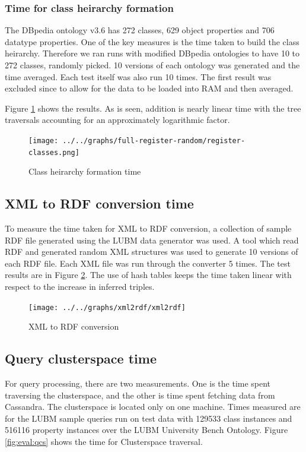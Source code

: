 \documentclass[conference]{IEEEtran}
\begin{document}
\subsubsection{Time for class heirarchy formation}

The DBpedia ontology v3.6 has 272 classes, 629 object properties and 706
datatype properties. One of the key measures is the time taken to build the
class heirarchy. Therefore we ran runs with modified DBpedia ontologies to have
10 to 272 classes, randomly picked. 10 versions of each ontology was generated
and the time averaged. Each test itself was also run 10 times. The first
result was excluded since to allow for the data to be loaded into RAM and
then averaged.

Figure \ref{fig:eval:cs-ch-form} shows the results. As is seen, addition is
nearly linear time with the tree traversals
accounting for an approximately logarithmic factor.

\begin{figure}[h]
    \centering
    \texttt{[image: ../../graphs/full-register-random/register-classes.png]}
    \caption{Class heirarchy formation time}
    \label{fig:eval:cs-ch-form}
\end{figure}

\subsection{XML to RDF conversion time}

To measure the time taken for XML to RDF conversion, a collection of sample RDF file
generated using the LUBM data generator was used. A tool which read RDF and generated random XML structures
was used to generate 10 versions of each RDF file. Each XML file was run through the converter 5 times. The test results are in Figure \ref{fig:eval:xml2rdf}. The use of hash tables keeps the time taken linear with respect to the increase in inferred triples.

\begin{figure}[h]
    \centering
    \texttt{[image: ../../graphs/xml2rdf/xml2rdf]}
    \caption{XML to RDF conversion}
    \label{fig:eval:xml2rdf}
\end{figure}

\subsection{Query clusterspace time}

For query processing, there are two measurements. One is the time spent traversing the clusterspace, and the other is time spent fetching data from Cassandra. The clusterspace is located only on one machine. Times measured are for the LUBM sample queries run on test data with 129533 class instances and 516116 property instances over the LUBM University Bench Ontology. Figure \ref{fig:eval:qcs} shows the time for Clusterspace traversal.
\end{document}
